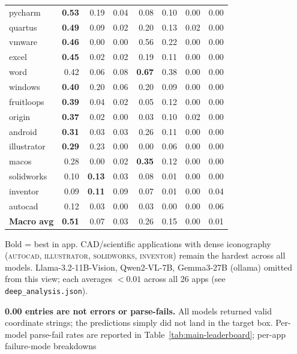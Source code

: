 \begin{table}[t]
\begin{threeparttable}
\begin{tabular}{@{}lrrrrrrr@{}}
pycharm         & \textbf{0.53} & 0.19 & 0.04 & 0.08 & 0.10 & 0.00 & 0.00 \\
quartus         & \textbf{0.49} & 0.09 & 0.02 & 0.20 & 0.13 & 0.02 & 0.00 \\
vmware          & \textbf{0.46} & 0.00 & 0.00 & 0.56 & 0.22 & 0.00 & 0.00 \\
excel           & \textbf{0.45} & 0.02 & 0.02 & 0.19 & 0.11 & 0.00 & 0.00 \\
word            & 0.42          & 0.06 & 0.08 & \textbf{0.67} & 0.38 & 0.00 & 0.00 \\
windows         & \textbf{0.40} & 0.20 & 0.06 & 0.20 & 0.09 & 0.00 & 0.00 \\
fruitloops      & \textbf{0.39} & 0.04 & 0.02 & 0.05 & 0.12 & 0.00 & 0.00 \\
origin          & \textbf{0.37} & 0.02 & 0.00 & 0.03 & 0.10 & 0.02 & 0.00 \\
android         & \textbf{0.31} & 0.03 & 0.03 & 0.26 & 0.11 & 0.00 & 0.00 \\
illustrator     & \textbf{0.29} & 0.23 & 0.00 & 0.00 & 0.06 & 0.00 & 0.00 \\
macos           & 0.28          & 0.00 & 0.02 & \textbf{0.35} & 0.12 & 0.00 & 0.00 \\
solidworks      & 0.10          & \textbf{0.13} & 0.03 & 0.08 & 0.01 & 0.00 & 0.00 \\
inventor        & 0.09          & \textbf{0.11} & 0.09 & 0.07 & 0.01 & 0.00 & 0.04 \\
autocad         & 0.12          & 0.03 & 0.00 & 0.03 & 0.00 & 0.00 & 0.06 \\
\midrule
\textbf{Macro avg} & \textbf{0.51} & 0.07 & 0.03 & 0.26 & 0.15 & 0.00 & 0.01 \\
\bottomrule
\end{tabular}
\begin{tablenotes}
\footnotesize
\item Bold = best in app. CAD/scientific applications with dense iconography
(\textsc{autocad}, \textsc{illustrator}, \textsc{solidworks}, \textsc{inventor})
remain the hardest across all models. Llama-3.2-11B-Vision, Qwen2-VL-7B,
Gemma3-27B (ollama) omitted from this view; each averages $<0.01$
across all 26 apps (see \texttt{deep\_analysis.json}).
\item \textbf{0.00 entries are not errors or parse-fails.} All models
returned valid coordinate strings; the predictions simply did not land
in the target box. Per-model parse-fail rates are reported in
Table~\ref{tab:main-leaderboard}; per-app failure-mode breakdowns

\end{tablenotes}
\end{threeparttable}
\end{table}
